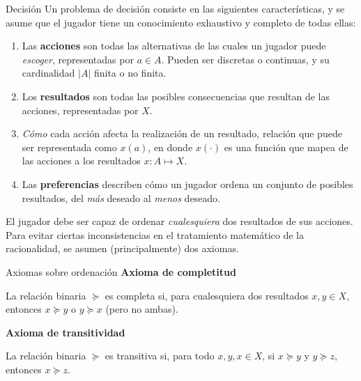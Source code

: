 \documentclass[12pt]{scrartcl}
\theoremstyle{definition}
\begin{document}
\begin{mybox}[colback=gray!10]{Decisión}
	Un problema de decisión consiste en las siguientes características, y se asume que el jugador tiene un conocimiento exhaustivo y completo de todas ellas:
	\begin{enumerate}
		\item Las \textbf{acciones} son todas las alternativas de las cuales un jugador puede \textit{escoger}, representadas por $a\in A$. Pueden ser discretas o continuas, y su cardinalidad $|A|$ finita o no finita.
		\item Los \textbf{resultados} son todas las posibles consecuencias que resultan de las acciones, representadas por $X$.
		\item \textit{Cómo} cada acción afecta la realización de un resultado, relación que puede ser representada como $x(a)$, en donde $x(\cdot)$ es una función que mapea de las acciones a los resultados $x\colon A \mapsto X$.
		\item Las \textbf{preferencias} describen cómo un jugador ordena un conjunto de posibles resultados, del \textit{más} deseado al \textit{menos} deseado. 
	\end{enumerate}
\end{mybox}

El jugador debe ser capaz de ordenar \textit{cualesquiera} dos resultados de sus acciones. Para evitar ciertas inconsistencias en el tratamiento matemático de la racionalidad, se asumen (principalmente) dos axiomas. 

\begin{mybox}[colback=gray!10]{Axiomas sobre ordenación}
	\textbf{Axioma de completitud}
	
	La relación binaria \textbf{$\succeq$} es completa si, para cualesquiera dos resultados $x, y \in X$, entonces $x \succeq y$ o $y \succeq x$ (pero no ambas).

	\textbf{Axioma de transitividad}
	
	La relación binaria $\succeq$ es transitiva si, para todo $x, y, x \in X$, si $x \succeq y$ y $y \succeq z$, entonces $x\succeq z$.

\end{mybox}
\end{document}
